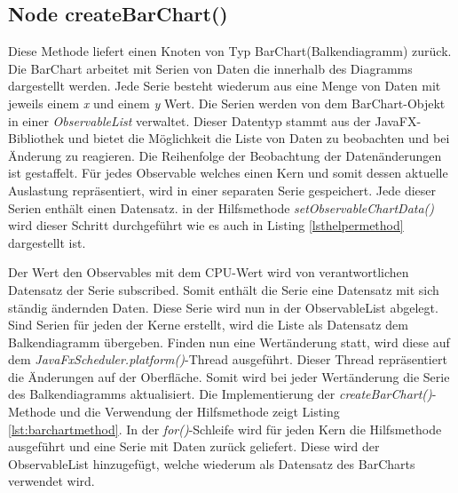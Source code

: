\subsection{Node createBarChart()}
 
Diese Methode liefert einen Knoten von Typ BarChart(Balkendiagramm) zurück. Die BarChart arbeitet mit Serien von Daten die innerhalb des Diagramms dargestellt werden. Jede Serie besteht wiederum aus eine Menge von Daten mit jeweils einem \textit{x} und einem \textit{y} Wert. Die Serien werden von dem BarChart-Objekt in einer \textit{ObservableList} verwaltet. Dieser Datentyp stammt aus der JavaFX-Bibliothek und bietet die Möglichkeit die Liste von Daten zu beobachten und bei Änderung zu reagieren. Die Reihenfolge der Beobachtung der Datenänderungen ist gestaffelt. Für jedes Observable welches einen Kern und somit dessen aktuelle Auslastung repräsentiert, wird in einer separaten Serie gespeichert. Jede dieser Serien enthält einen Datensatz. in der Hilfsmethode \textit{setObservableChartData()} wird dieser Schritt durchgeführt wie es auch in Listing \ref{lsthelpermethod} dargestellt ist. 
 
Der Wert den Observables mit dem CPU-Wert wird von verantwortlichen Datensatz der Serie subscribed. Somit enthält die Serie eine Datensatz mit sich ständig ändernden Daten. Diese Serie wird nun in der ObservableList abgelegt. Sind Serien für jeden der Kerne erstellt, wird die Liste als Datensatz dem Balkendiagramm übergeben. Finden nun eine Wertänderung statt, wird diese auf dem \textit{JavaFxScheduler.platform()}-Thread ausgeführt. Dieser Thread repräsentiert die Änderungen auf der Oberfläche. Somit wird bei jeder Wertänderung die Serie des Balkendiagramms aktualisiert. Die Implementierung der \textit{createBarChart()}-Methode und die Verwendung der Hilfsmethode zeigt Listing \ref{lst:barchartmethod}. In der \textit{for()}-Schleife wird für jeden Kern die Hilfsmethode ausgeführt und eine Serie mit Daten zurück geliefert. Diese wird der ObservableList hinzugefügt, welche wiederum als Datensatz des BarCharts verwendet wird.
